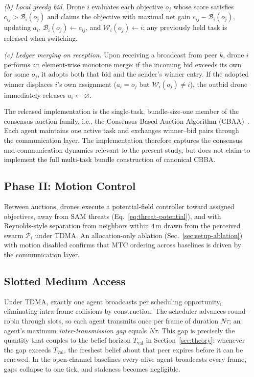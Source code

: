 \emph{(b) Local greedy bid.}
Drone $i$ evaluates each objective $o_j$ whose score satisfies $c_{ij} > \mathcal{B}_i(o_j)$ and claims the objective with maximal net gain $c_{ij} - \mathcal{B}_i(o_j)$, updating $a_i$, $\mathcal{B}_i(o_j) \leftarrow c_{ij}$, and $\mathcal{W}_i(o_j) \leftarrow i$; any previously held task is released when switching.

\emph{(c) Ledger merging on reception.}
Upon receiving a broadcast from peer $k$, drone $i$ performs an element-wise monotone merge: if the incoming bid exceeds its own for some $o_j$, it adopts both that bid and the sender's winner entry.
If the adopted winner displaces $i$'s own assignment ($a_i = o_j$ but $\mathcal{W}_i(o_j) \neq i$), the outbid drone immediately releases $a_i \leftarrow \varnothing$.

The released implementation is the single-task, bundle-size-one
member of the consensus-auction family, i.e., the Consensus-Based
Auction Algorithm (CBAA)~\cite{choi2009}. Each agent maintains one
active task and exchanges
winner--bid pairs through the communication layer. The implementation
therefore captures the consensus and communication dynamics relevant
to the present study, but does not claim to implement the full
multi-task bundle construction of canonical CBBA.
\subsection{Phase II: Motion Control}
Between auctions, drones execute a potential-field controller toward assigned objectives, away from SAM threats (Eq.~\eqref{eq:threat-potential}), and with Reynolds-style separation from neighbors within $4$\,m drawn from the perceived swarm $\mathcal{P}_i$ under TDMA.
An allocation-only ablation (Sec.~\ref{sec:setup-ablation}) with motion disabled confirms that MTC ordering across baselines is driven by the communication layer.

\subsection{Slotted Medium Access}\label{sec:method-slotted}
Under TDMA, exactly one agent broadcasts per scheduling opportunity, eliminating intra-frame collisions by construction.
The scheduler advances round-robin through slots, so each agent transmits once per frame of duration $N\tau$; an agent's maximum \emph{inter-transmission gap} equals $N\tau$.
This gap is precisely the quantity that couples to the belief horizon $T_{\mathrm{val}}$ in Section~\ref{sec:theory}: whenever the gap exceeds $T_{\mathrm{val}}$, the freshest belief about that peer expires before it can be renewed.
In the open-channel baselines every alive agent broadcasts every frame, gaps collapse to one tick, and staleness becomes negligible.

